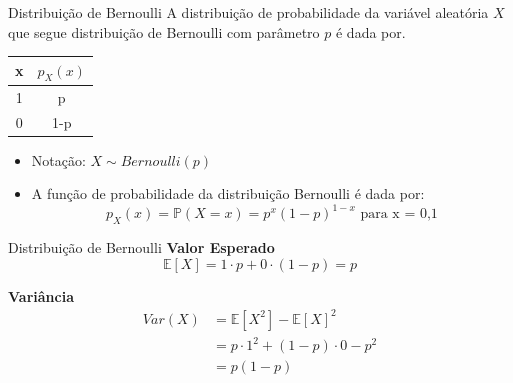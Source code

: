\begin{frame}{Distribuição de Bernoulli}
    A distribuição de probabilidade da variável aleatória $X$ que segue distribuição de Bernoulli com parâmetro $p$ é dada por. 

    \begin{table}[H]
    \centering
\begin{tabular}{cc}
\hline
x & $p_X(x)$ \\ \hline
1 & p        \\
0 & 1-p      \\ \hline
\end{tabular}
\end{table}

\begin{itemize}
    \item Notação: $X \sim Bernoulli(p)$
    \item A função de probabilidade da distribuição Bernoulli é dada por: $$p_X(x) = \mathds{P}(X=x) = p^x(1-p)^{1-x} \text{ para x = 0,1}$$
\end{itemize}
\end{frame}

\begin{frame}{Distribuição de Bernoulli}
    \textbf{Valor Esperado}
    $$\mathbb{E}[X] = 1\cdot p + 0 \cdot (1-p) = p$$
    
    \textbf{Variância}
    \begin{align*}
        Var(X) &= \mathbb{E}[X^2] - \mathbb{E}[X]^2\\
        &=p\cdot 1^2 + (1-p)\cdot 0 - p^2\\
        &= p(1-p)
    \end{align*}
\end{frame}

